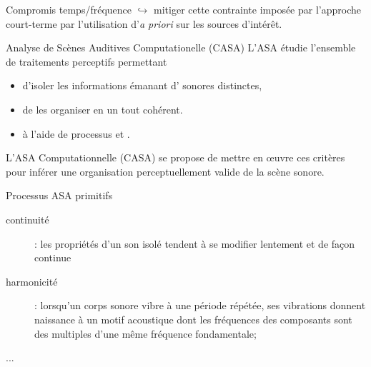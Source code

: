 \begin{frame}{Compromis temps/fréquence}
	$\hookrightarrow{}$ mitiger cette contrainte imposée par l'approche court-terme par l'utilisation d'\alert{\textit{a priori}} sur les sources d'intérêt.
\end{frame}

\begin{frame}{Analyse de Scènes Auditives Computationelle (CASA)}
L'ASA étudie l'ensemble de traitements perceptifs permettant
\begin{itemize}
\item d'isoler les informations émanant d' sonores distinctes,
\item de les organiser en un tout cohérent.
\item à l'aide de processus  et .
\end{itemize}
L'ASA Computationnelle (CASA) se propose de mettre en \oe{}uvre ces critères pour inférer une organisation perceptuellement valide de la scène sonore.
\end{frame}

\begin{frame}{Processus ASA \og primitifs \fg}
\begin{description}
\item[\alert<2>{continuité}] : les propriétés d'un son isolé tendent à se modifier lentement et de façon continue
\item[harmonicité] : lorsqu'un corps sonore vibre à une période répétée, ses vibrations donnent naissance à un motif acoustique dont les fréquences des composants sont des multiples d'une même fréquence fondamentale;
\item[...]
\end{description}
\end{frame}

